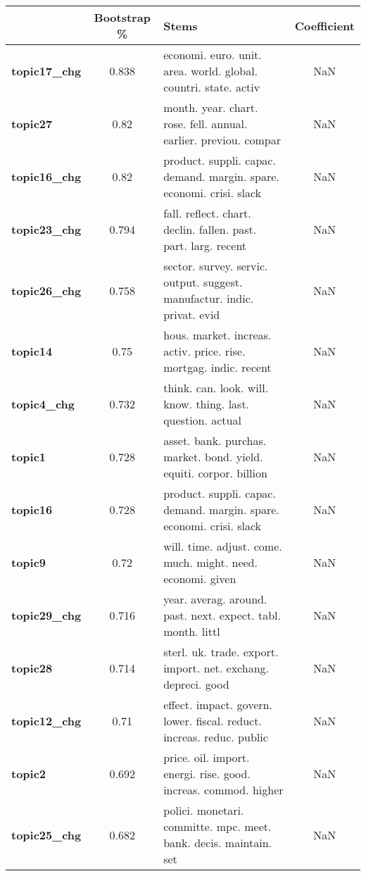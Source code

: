 \begin{tabular}{|l|c|l|c|}
\toprule
{} & Bootstrap \% &                                                                     Stems &  Coefficient \\
\midrule
\textbf{topic17\_chg} &  0.838 &  economi. euro. unit. area. world. global. countri. state. activ & NaN \\
\textbf{topic27    } &  0.82 &  month. year. chart. rose. fell. annual. earlier. previou. compar & NaN \\
\textbf{topic16\_chg} &  0.82 &  product. suppli. capac. demand. margin. spare. economi. crisi. slack & NaN \\
\textbf{topic23\_chg} &  0.794 &  fall. reflect. chart. declin. fallen. past. part. larg. recent & NaN \\
\textbf{topic26\_chg} &  0.758 &  sector. survey. servic. output. suggest. manufactur. indic. privat. evid & NaN \\
\textbf{topic14    } &  0.75 &  hous. market. increas. activ. price. rise. mortgag. indic. recent & NaN \\
\textbf{topic4\_chg } &  0.732 &  think. can. look. will. know. thing. last. question. actual & NaN \\
\textbf{topic1     } &  0.728 &  asset. bank. purchas. market. bond. yield. equiti. corpor. billion & NaN \\
\textbf{topic16    } &  0.728 &  product. suppli. capac. demand. margin. spare. economi. crisi. slack & NaN \\
\textbf{topic9     } &  0.72 &  will. time. adjust. come. much. might. need. economi. given & NaN \\
\textbf{topic29\_chg} &  0.716 &  year. averag. around. past. next. expect. tabl. month. littl & NaN \\
\textbf{topic28    } &  0.714 &  sterl. uk. trade. export. import. net. exchang. depreci. good & NaN \\
\textbf{topic12\_chg} &  0.71 &  effect. impact. govern. lower. fiscal. reduct. increas. reduc. public & NaN \\
\textbf{topic2     } &  0.692 &  price. oil. import. energi. rise. good. increas. commod. higher & NaN \\
\textbf{topic25\_chg} &  0.682 &  polici. monetari. committe. mpc. meet. bank. decis. maintain. set & NaN \\
\bottomrule
\end{tabular}
